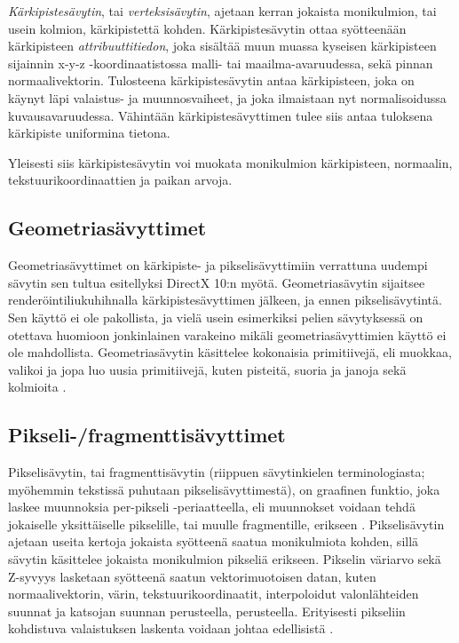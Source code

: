 \documentclass[finnish]{tktltiki2}
\theoremstyle{definition}
\theoremstyle{remark}
\begin{document}
\emph{Kärkipistesävytin}, tai \emph{verteksisävytin}, ajetaan kerran jokaista monikulmion, tai usein kolmion, kärkipistettä kohden. Kärkipistesävytin ottaa syötteenään kärkipisteen \emph{attribuuttitiedon}, joka sisältää muun muassa kyseisen kärkipisteen sijainnin x-y-z -koordinaatistossa malli- tai maailma-avaruudessa, sekä pinnan normaalivektorin. Tulosteena kärkipistesävytin antaa kärkipisteen, joka on käynyt läpi valaistus- ja muunnosvaiheet, ja joka ilmaistaan nyt normalisoidussa kuvausavaruudessa. Vähintään kärkipistesävyttimen tulee siis antaa tuloksena kärkipiste uniformina tietona. \cite{Puh08}

Yleisesti siis kärkipistesävytin voi muokata monikulmion kärkipisteen, normaalin, tekstuurikoordinaattien ja paikan arvoja.

\subsection{Geometriasävyttimet}

Geometriasävyttimet on kärkipiste- ja pikselisävyttimiin verrattuna uudempi sävytin sen tultua esitellyksi DirectX 10:n myötä. Geometriasävytin sijaitsee renderöintiliukuhihnalla kärkipistesävyttimen jälkeen, ja ennen pikselisävytintä. Sen käyttö ei ole pakollista, ja vielä usein esimerkiksi pelien sävytyksessä on otettava huomioon jonkinlainen varakeino mikäli geometriasävyttimien käyttö ei ole mahdollista. Geometriasävytin käsittelee kokonaisia primitiivejä, eli muokkaa, valikoi ja jopa luo uusia primitiivejä, kuten pisteitä, suoria ja janoja sekä kolmioita \cite{Gre14}.

\subsection{Pikseli-/fragmenttisävyttimet}

Pikselisävytin, tai fragmenttisävytin (riippuen sävytinkielen terminologiasta; myöhemmin tekstissä puhutaan pikselisävyttimestä), on graafinen funktio, joka laskee muunnoksia per-pikseli -periaatteella, eli muunnokset voidaan tehdä jokaiselle yksittäiselle pikselille, tai muulle fragmentille, erikseen \cite{}. Pikselisävytin ajetaan useita kertoja jokaista syötteenä saatua monikulmiota kohden, sillä sävytin käsittelee jokaista monikulmion pikseliä erikseen. Pikselin väriarvo sekä Z-syvyys lasketaan syötteenä saatun vektorimuotoisen datan, kuten normaalivektorin, värin, tekstuurikoordinaatit, interpoloidut valonlähteiden suunnat ja katsojan suunnan perusteella, perusteella. Erityisesti pikseliin kohdistuva valaistuksen laskenta voidaan johtaa edellisistä \cite{Puh08}.
\end{document}
